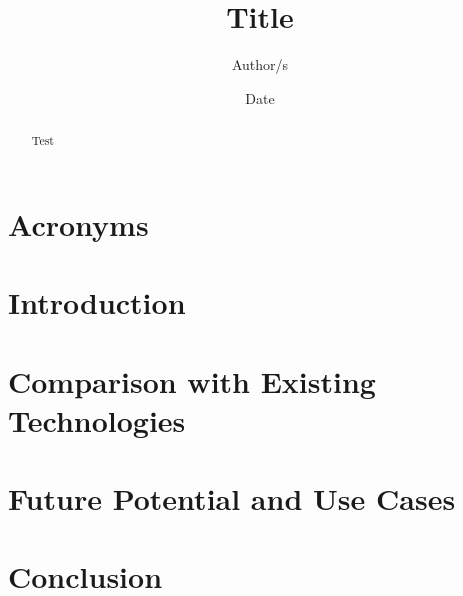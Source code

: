\documentclass[hidelinks]{article}
\begin{document}
\title{Title}
\author{Author/s}
\date{Date}

\maketitle

\begin{abstract}

Test

\end{abstract}

\setcounter{tocdepth}{1}
\tableofcontents

\section*{Acronyms}
\printacronyms[heading=none]
\label{sec:intro}

\section{Introduction}


\section{Comparison with Existing Technologies}


\section{Future Potential and Use Cases}



\section{Conclusion}



\clearpage


\end{document}
